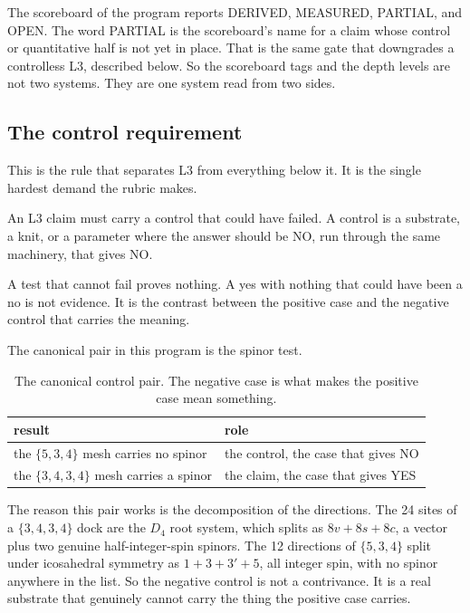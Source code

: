 The scoreboard of the program reports DERIVED, MEASURED, PARTIAL, and OPEN. The word PARTIAL is the scoreboard's name for a claim whose control or quantitative half is not yet in place. That is the same gate that downgrades a controlless L3, described below. So the scoreboard tags and the depth levels are not two systems. They are one system read from two sides.

\subsection{The control requirement}

This is the rule that separates L3 from everything below it. It is the single hardest demand the rubric makes.

\begin{principle}
An L3 claim must carry a control that could have failed. A control is a substrate, a knit, or a parameter where the answer should be NO, run through the same machinery, that gives NO.
\end{principle}

A test that cannot fail proves nothing. A yes with nothing that could have been a no is not evidence. It is the contrast between the positive case and the negative control that carries the meaning.

The canonical pair in this program is the spinor test.

\begin{table}[ht]
\centering
\begin{tabular}{@{}ll@{}}
\toprule
result & role \\
\midrule
the $\{5,3,4\}$ mesh carries no spinor & the control, the case that gives NO \\
the $\{3,4,3,4\}$ mesh carries a spinor & the claim, the case that gives YES \\
\bottomrule
\end{tabular}
\caption{The canonical control pair. The negative case is what makes the positive case mean something.}
\label{tab:spinor-control}
\end{table}

The reason this pair works is the decomposition of the directions. The 24 sites of a $\{3,4,3,4\}$ dock are the $D_4$ root system, which splits as $8v + 8s + 8c$, a vector plus two genuine half-integer-spin spinors. The 12 directions of $\{5,3,4\}$ split under icosahedral symmetry as $1 + 3 + 3' + 5$, all integer spin, with no spinor anywhere in the list. So the negative control is not a contrivance. It is a real substrate that genuinely cannot carry the thing the positive case carries.

